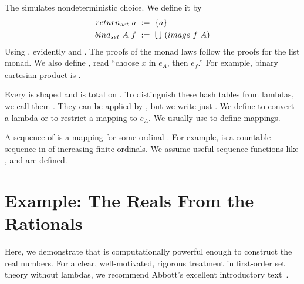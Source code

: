 The  simulates nondeterministic choice. We define it by
\begin{equation}
\begin{aligned}
	return_{set}~a &\ :=\ \{{a}\} \\
	bind_{set}~A~f &\ :=\ \textstyle\bigcup~(image~f~A)
\end{aligned}
\end{equation}
Using , evidently  and . The proofs of the monad laws follow the proofs for the list monad. We also define
, read ``choose $\mathit{x}$ in $\mathit{e_A}$, then $\mathit{e_f}$.'' For example, binary cartesian product is
.

Every  is shaped  and is total on . To distinguish these hash tables from lambdas, we call them . They can be applied by
, but we write just .
We define 
to convert a lambda or to restrict a mapping to $e_A$. We usually use  to define mappings.

A sequence of  is a mapping  for some ordinal \tlzfc{\alpha}. For example,  is a countable sequence in \tlzfc{\lnat \to \lnat} of increasing finite ordinals. We assume useful sequence functions like ,  and  are defined.


\section{Example: The Reals From the Rationals}
\label{sec:reals}

Here, we demonstrate that \targetlang is computationally powerful enough to construct the real numbers. For a clear, well-motivated, rigorous treatment in first-order set theory without lambdas, we recommend Abbott's excellent introductory text~\cite{cit:abbott-analysis}.

